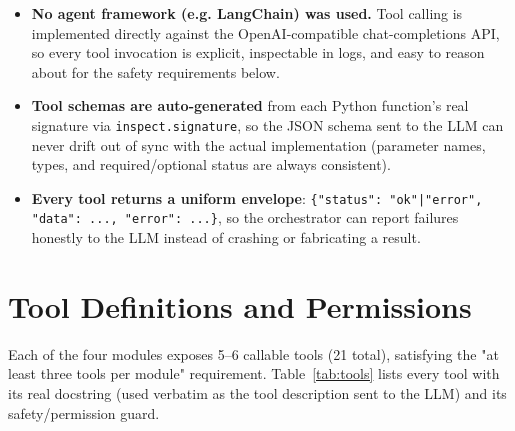 \documentclass[11pt,a4paper]{article}
\begin{document}
\begin{itemize}
  \item \textbf{No agent framework (e.g. LangChain) was used.} Tool calling
  is implemented directly against the OpenAI-compatible chat-completions
  API, so every tool invocation is explicit, inspectable in logs, and easy
  to reason about for the safety requirements below.
  \item \textbf{Tool schemas are auto-generated} from each Python function's
  real signature via \texttt{inspect.signature}, so the JSON schema sent to
  the LLM can never drift out of sync with the actual implementation
  (parameter names, types, and required/optional status are always
  consistent).
  \item \textbf{Every tool returns a uniform envelope}:
  \texttt{\{"status": "ok"|"error", "data": ..., "error": ...\}}, so the
  orchestrator can report failures honestly to the LLM instead of crashing
  or fabricating a result.
\end{itemize}

\section{Tool Definitions and Permissions}

Each of the four modules exposes 5--6 callable tools (21 total), satisfying
the "at least three tools per module" requirement. Table~\ref{tab:tools}
lists every tool with its real docstring (used verbatim as the tool
description sent to the LLM) and its safety/permission guard.
\end{document}
